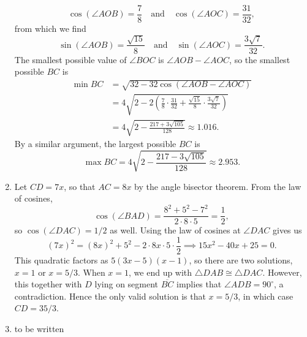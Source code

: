 \begin{enumerate}
\begin{equation*}
\cos(\angle AOB) = \frac{7}{8}\quad\text{and}\quad\cos(\angle AOC) = \frac{31}{32},
\end{equation*}
from which we find
\begin{equation*}
\sin(\angle AOB) = \frac{\sqrt{15}}{8}\quad\text{and}\quad\sin(\angle AOC) = \frac{3\sqrt{7}}{32}.
\end{equation*}
The smallest possible value of $\angle BOC$ is $\angle AOB - \angle AOC$, so the smallest possible $BC$ is
\begin{align*}
\min BC &= \sqrt{32 - 32\cos(\angle AOB - \angle AOC)} \\
&= 4\sqrt{2 - 2\left(\frac{7}{8}\cdot\frac{31}{32} + \frac{\sqrt{15}}{8}\cdot\frac{3\sqrt{7}}{32}\right)} \\
&= 4\sqrt{2 - \frac{217 + 3\sqrt{105}}{128}}\approx 1.016.
\end{align*}
By a similar argument, the largest possible $BC$ is
\begin{equation*}
\max BC = 4\sqrt{2 - \frac{217 - 3\sqrt{105}}{128}}\approx 2.953.
\end{equation*}
\item Let $CD = 7x$, so that $AC = 8x$ by the angle bisector theorem. From the law of cosines,
\begin{equation*}
\cos(\angle BAD) = \frac{8^2 + 5^2 - 7^2}{2\cdot 8\cdot 5} = \frac{1}{2},
\end{equation*}
so $\cos(\angle DAC) = 1/2$ as well. Using the law of cosines at $\angle DAC$ gives us
\begin{equation*}
(7x)^2 = (8x)^2 + 5^2 - 2\cdot 8x\cdot 5\cdot\frac{1}{2}\implies 15x^2 - 40x + 25 = 0.
\end{equation*}
This quadratic factors as $5(3x - 5)(x - 1)$, so there are two solutions, $x = 1$ or $x = 5/3$. When $x = 1$, we end up with $\triangle DAB\cong\triangle DAC$. However, this together with $D$ lying on segment $\overline{BC}$ implies that $\angle ADB = 90^{\circ}$, a contradiction. Hence the only valid solution is that $x = 5/3$, in which case $CD = 35/3$.
\item to be written
\end{enumerate}